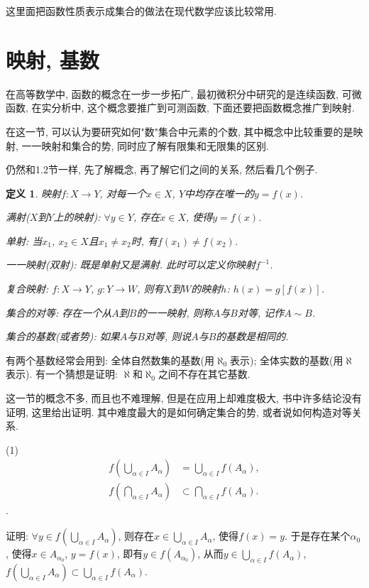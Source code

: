 \documentclass[12pt,a4paper,openany]{book}
\newtheorem{definition}{定义}[section]
\begin{document}
这里面把函数性质表示成集合的做法在现代数学应该比较常用.

\section{映射, 基数}
在高等数学中, 函数的概念在一步一步拓广, 最初微积分中研究的是连续函数, 可微函数, 在实分析中, 这个概念要推广到可测函数, 下面还要把函数概念推广到映射.

在这一节, 可以认为要研究如何"数"集合中元素的个数, 其中概念中比较重要的是映射, 一一映射和集合的势, 同时应了解有限集和无限集的区别.

仍然和1.2节一样, 先了解概念, 再了解它们之间的关系, 然后看几个例子.

\begin{definition}
映射$f: X \rightarrow Y$, 对每一个$x \in X$, $Y$中均存在唯一的$y = f(x)$.

满射($X$到$Y$上的映射): $\forall y \in Y$, 存在$x \in X$, 使得$y = f(x)$.

单射: 当$x_1$, $x_2 \in X$且$x_1 \neq x_2$时, 有$f(x_1) \neq f(x_2)$.

一一映射(双射): 既是单射又是满射. 此时可以定义你映射$f^{-1}$.

复合映射: $f: X \rightarrow Y$, $g: Y \rightarrow W$, 则有$X$到$W$的映射$h$: $h(x) = g[f(x)]$.

集合的对等: 存在一个从$A$到$B$的一一映射, 则称$A$与$B$对等, 记作$A \sim B$.

集合的基数(或者势): 如果$A$与$B$对等, 则说$A$与$B$的基数是相同的.
\end{definition}

有两个基数经常会用到: 全体自然数集的基数(用$\aleph_0$表示); 全体实数的基数(用$\aleph$表示). 有一个猜想是证明: $\aleph$和$\aleph_0$之间不存在其它基数.

这一节的概念不多, 而且也不难理解, 但是在应用上却难度极大, 书中许多结论没有证明, 这里给出证明. 其中难度最大的是如何确定集合的势, 或者说如何构造对等关系.

(1) 
$$
\begin{aligned}
f(\bigcup_{\alpha \in I}{A_{\alpha}}) &= \bigcup_{\alpha \in I}{f(A_{\alpha})}, \\
f(\bigcap_{\alpha \in I}{A_{\alpha}}) &\subset \bigcap_{\alpha \in I}{f(A_{\alpha})}.
\end{aligned}
$$.

证明: $\forall y \in f(\bigcup\limits_{\alpha \in I}{A_{\alpha}})$, 则存在$x \in \bigcup\limits_{\alpha \in I}{A_{\alpha}}$, 使得$f(x) = y$. 于是存在某个$\alpha_0$, 使得$x \in A_{\alpha_0}$, $y = f(x)$, 即有$y \in f(A_{\alpha_0})$, 从而$y \in \bigcup\limits_{\alpha \in I}{f(A_{\alpha})}$, $f(\bigcup\limits_{\alpha \in I}{A_{\alpha}}) \subset \bigcup\limits_{\alpha \in I}{f(A_{\alpha})}$.
\end{document}
